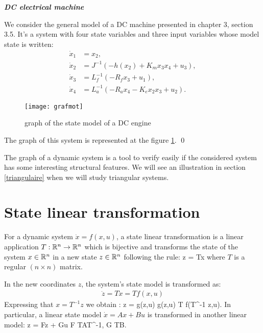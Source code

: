 \begin{exemple}{\bf \em DC electrical machine}

We consider the general model of a DC machine presented in chapter 3, section 3.5. It’s a system with four state variables and three input variables whose model state is written:
\begin{equation*} \begin{split}
\dot x_1 &= x_2, \\
\dot x_2 &= J^{-1}( -h(x_2) + K_mx_3x_4 + u_3), \\
\dot x_3 &= L_f^{-1}(-R_fx_3 + u_1 ), \\
\dot x_4 &= L_a^{-1}(-R_ax_4 - K_ex_2x_3 + u_2).
\end{split} \end{equation*} 
\begin{figure}[htbp] 
   \centering
   \texttt{[image: grafmot]} 
   \caption{graph of the state model of a DC engine}
   \label{Fig:grafmot}
\end{figure}
The graph of this system is represented at the figure \ref{Fig:grafmot}. \qed
\end{exemple}

The graph of a dynamic system is a tool to verify easily if the considered system has some interesting structural features. We will see an illustration in section \ref{triangulaire} when we will study triangular systems.

\section{State linear transformation}

For a dynamic system  $\dot x = f(x,u)$, a state linear transformation is a linear application  $T : \mathbb{R}^n
\rightarrow \mathbb{R}^n$ which is bijective and transforms the state of the system 
$x \in \mathbb{R}^n$ in a new state  $z \in \mathbb{R}^n$ following the rule:
\eqnn
z = Tx
\eeqnn
where $T$ is a regular $(n \times n)$ matrix.

In the new coordinates  $z$, the system’s state model is transformed as:
\begin{equation*} \begin{split}
\dot z = T \dot x = Tf(x,u)
\end{split} \end{equation*}
Expressing that  $x= T^{-1}z$ we obtain :
\eqnn
\dot z = g(z,u) \hd {} \hd g(z,u) \triangleq T f(T^{-1} z,u).
\eeqnn
In particular, a linear state model  $\dot x = Ax + Bu$
is transformed in another linear model:
\eqnn
\dot z = Fz + Gu \hd
{} \hd F \triangleq TAT^{-1}, \;\;   G \triangleq TB.
\eeqnn

